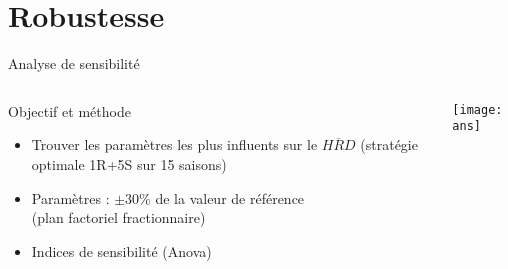 \section{Robustesse}

\begin{frame}{Analyse de sensibilité}


\begin{columns}

 \begin{column}{.5\textwidth}
 
\begin{block}{Objectif et méthode}
\begin{itemize}[itemsep=10pt]

\item Trouver les paramètres les plus influents sur le $\overline{HRD}$ (stratégie optimale 1R+5S sur 15 saisons) 
\item Paramètres : $\pm{30\%}$ de la valeur de référence \\(plan factoriel fractionnaire) 
\item Indices de sensibilité (Anova)

\end{itemize}

\end{block}
\end{column}

 \begin{column}{.5\textwidth}

 \begin{center}

    \texttt{[image: ans]}

 \end{center}


\end{column}
\end{columns}
        
\end{frame}


